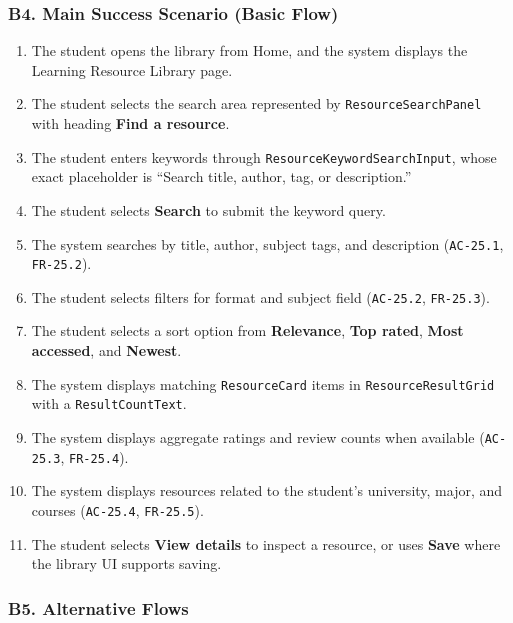 \documentclass[12pt]{article}
\begin{document}
\hypertarget{sec:b4-main-success-scenario-basic-flow}{}
\subsubsection*{B4. Main Success Scenario (Basic Flow)}
\par\medskip

\begin{enumerate}
\item The student opens the library from Home, and the system displays the Learning Resource Library page.
\item The student selects the search area represented by \texttt{ResourceSearchPanel} with heading \textbf{Find a resource}.
\item The student enters keywords through \texttt{ResourceKeywordSearchInput}, whose exact placeholder is “Search title, author, tag, or description.”
\item The student selects \textbf{Search} to submit the keyword query.
\item The system searches by title, author, subject tags, and description (\texttt{AC-25.1}, \texttt{FR-25.2}).
\item The student selects filters for format and subject field (\texttt{AC-25.2}, \texttt{FR-25.3}).
\item The student selects a sort option from \textbf{Relevance}, \textbf{Top rated}, \textbf{Most accessed}, and \textbf{Newest}.
\item The system displays matching \texttt{ResourceCard} items in \texttt{ResourceResultGrid} with a \texttt{ResultCountText}.
\item The system displays aggregate ratings and review counts when available (\texttt{AC-25.3}, \texttt{FR-25.4}).
\item The system displays resources related to the student's university, major, and courses (\texttt{AC-25.4}, \texttt{FR-25.5}).
\item The student selects \textbf{View details} to inspect a resource, or uses \textbf{Save} where the library UI supports saving.
\end{enumerate}
\par\medskip

\hypertarget{sec:b5-alternative-flows}{}
\subsubsection*{B5. Alternative Flows}
\par\medskip
\end{document}

